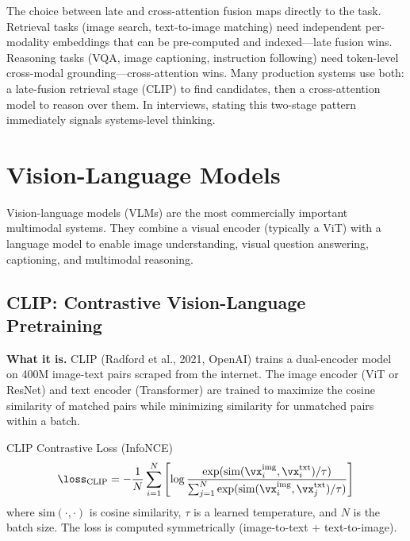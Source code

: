 \begin{keyinsight}
The choice between late and cross-attention fusion maps directly to the task. Retrieval tasks (image search, text-to-image matching) need independent per-modality embeddings that can be pre-computed and indexed---late fusion wins. Reasoning tasks (VQA, image captioning, instruction following) need token-level cross-modal grounding---cross-attention wins. Many production systems use both: a late-fusion retrieval stage (CLIP) to find candidates, then a cross-attention model to reason over them. In interviews, stating this two-stage pattern immediately signals systems-level thinking.
\end{keyinsight}

\section{Vision-Language Models}
\label{sec:vision_language_models}

Vision-language models (VLMs) are the most commercially important multimodal systems. They combine a visual encoder (typically a ViT) with a language model to enable image understanding, visual question answering, captioning, and multimodal reasoning.

\subsection{CLIP: Contrastive Vision-Language Pretraining}

\textbf{What it is.} CLIP (Radford et al., 2021, OpenAI) trains a dual-encoder model on 400M image-text pairs scraped from the internet. The image encoder (ViT or ResNet) and text encoder (Transformer) are trained to maximize the cosine similarity of matched pairs while minimizing similarity for unmatched pairs within a batch.

\begin{mathresult}{CLIP Contrastive Loss (InfoNCE)}
\begin{equation}
\loss_{\text{CLIP}} = -\frac{1}{N}\sum_{i=1}^{N}\left[\log \frac{\exp(\text{sim}(\vx_i^{\text{img}}, \vx_i^{\text{txt}}) / \tau)}{\sum_{j=1}^{N}\exp(\text{sim}(\vx_i^{\text{img}}, \vx_j^{\text{txt}}) / \tau)}\right]
\end{equation}
where $\text{sim}(\cdot,\cdot)$ is cosine similarity, $\tau$ is a learned temperature, and $N$ is the batch size. The loss is computed symmetrically (image-to-text + text-to-image).
\end{mathresult}

